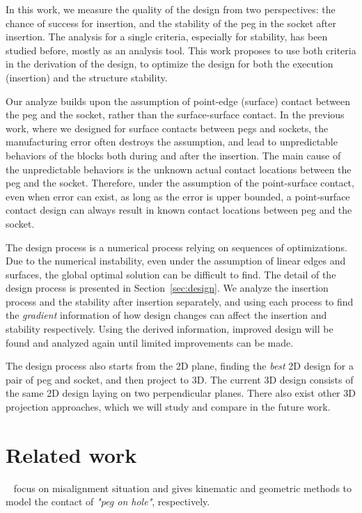 \documentclass[11pt, twocolumn]{article}
\begin{document}
In this work, we measure the quality of the design from two perspectives: the chance of success for insertion, and the stability of the peg in the socket after insertion. The analysis for a single criteria, especially for stability, has been studied before, mostly as an analysis tool. This work proposes to use both criteria in the derivation of the design, to optimize the design for both the execution (insertion) and the structure stability. 

Our analyze builds upon the assumption of point-edge (surface) contact between the peg and the socket, rather than the surface-surface contact. In the previous work, where we designed for surface contacts between pegs and sockets, the manufacturing error often destroys the assumption, and lead to unpredictable behaviors of the blocks both during and after the insertion. The main cause of the unpredictable behaviors is the unknown actual contact locations between the peg and the socket. Therefore, under the assumption of the point-surface contact, even when error can exist, as long as the error is upper bounded, a point-surface contact design can always result in known contact locations between peg and the socket. 

The design process is a numerical process relying on sequences of optimizations. Due to the numerical instability, even under the assumption of linear edges and surfaces, the global optimal solution can be difficult to find. The detail of the design process is presented in Section~\ref{sec:design}. We analyze the insertion process and the stability after insertion separately, and using each process to find the {\em gradient} information of how design changes can affect the insertion and stability respectively. Using the derived information, improved design will be found and analyzed again until limited improvements can be made. 

The design process also starts from the 2D plane, finding the {\em best} 2D design for a pair of peg and socket, and then project to 3D. The current 3D design consists of the same 2D design laying on two perpendicular planes. There also exist other 3D projection approaches, which we will study and compare in the future work. 

\section{Related work}


~\cite{bruyninckx1995peg} focus on misalignment situation and gives kinematic and geometric methods to model the contact  of {\em"peg on hole"}, respectively.
\end{document}
